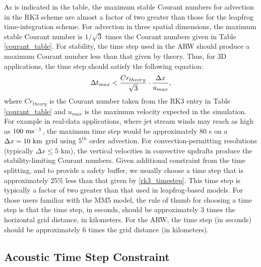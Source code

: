 As is indicated in the table, the maximum stable Courant numbers for
advection in the RK3 scheme are almost a factor of two greater than
those for the leapfrog time-integration scheme.  For advection in three
spatial dimensions, the maximum stable Courant number is $1/\sqrt{3}$
times the Courant numbers given in Table \ref{courant_table}.  For
stability, the time step used in the ARW should produce a maximum
Courant number less than that given by theory.  Thus, for 3D
applications, the time step should satisfy the following equation:
%
\begin{equation}
\Delta t_{max} < {Cr_{theory} \over \sqrt{3}} \cdot {\Delta x \over
u_{max}},
\label{rk3_timestep}
\end{equation}
%
\noindent
where $Cr_{theory}$ is the Courant number taken from the RK3 entry in
Table \ref{courant_table} and $u_{max}$ is the maximum velocity expected
in the simulation.  For example in real-data applications, where jet
stream winds may reach as high as $100\,\,\hbox{ms}^{-1}$, the maximum
time step would be approximately 80 s on a $\Delta x = 10 \,\,\hbox{km}$ grid 
using $5^{th}$ order advection.  For convection-permitting resolutions
(typically $\Delta x \le 5$ km), the vertical velocities in convective
updrafts produce the stability-limiting Courant numbers.
Given additional constraint from the time splitting, and to provide a
safety buffer, we usually choose a time step that is approximately 25\%
less than that given by \eqref{rk3_timestep}.  This time step is
typically a factor of two greater than that used in leapfrog-based
models.  For those users familiar with the MM5 model, the rule of thumb
for choosing a time step is that the time step, in seconds, should be 
approximately 3 times the horizontal grid distance, in kilometers.
For the ARW, the time step (in seconds) should be approximately 
6 times the grid distance (in kilometers).  

\subsection{Acoustic Time Step Constraint}
\label{acoustic_step_constraint}

